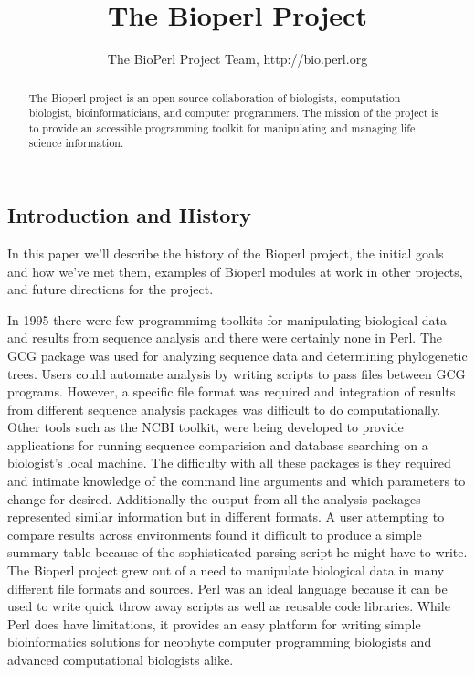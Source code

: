 \documentclass{article}
\begin{document}
\begin{twocolumn}
\title{The Bioperl Project}
\author{The BioPerl Project Team, http://bio.perl.org}
\maketitle

\begin{abstract}
The Bioperl project is an open-source collaboration of biologists,
computation biologist, bioinformaticians, and computer programmers.
The mission of the project is to provide an accessible programming
toolkit for manipulating and managing life science information.
\end{abstract}

\section{Introduction and History}

In this paper we'll describe the history of the Bioperl project, the
initial goals and how we've met them, examples of Bioperl modules at
work in other projects, and future directions for the project.

In 1995 there were few programmimg toolkits for manipulating
biological data and results from sequence analysis and there were
certainly none in Perl.  The GCG package \cite{GCG} was used for
analyzing sequence data and determining phylogenetic trees.  Users
could automate analysis by writing scripts to pass files between GCG
programs.  However, a specific file format was required and
integration of results from different sequence analysis packages was
difficult to do computationally. Other tools such as the NCBI toolkit,
were being developed to provide applications for running sequence
comparision and database searching on a biologist's local machine.
The difficulty with all these packages is they required and intimate
knowledge of the command line arguments and which parameters to change
for desired.  Additionally the output from all the analysis packages
represented similar information but in different formats.  A user
attempting to compare results across environments found it difficult
to produce a simple summary table because of the sophisticated parsing
script he might have to write. \\

The Bioperl project grew out of a need to manipulate biological data
in many different file formats and sources.  Perl was an ideal
language because it can be used to write quick throw away scripts as
well as reusable code libraries.  While Perl does have limitations, it
provides an easy platform for writing simple bioinformatics solutions
for neophyte computer programming biologists and advanced
computational biologists alike.


\end{twocolumn}
\end{document}
